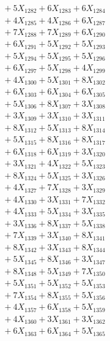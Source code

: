 \documentclass[a4paper,10pt]{article}
\begin{document}
{\begin{align}
&\;  + 5 X_{1282} + 6 X_{1283} + 6 X_{1284} \\[0.3ex]
&\;  + 4 X_{1285} + 4 X_{1286} + 6 X_{1287} \\[0.3ex]
&\;  + 7 X_{1288} + 7 X_{1289} + 6 X_{1290} \\[0.3ex]
&\;  + 6 X_{1291} + 5 X_{1292} + 5 X_{1293} \\[0.3ex]
&\;  + 5 X_{1294} + 5 X_{1295} + 5 X_{1296} \\[0.3ex]
&\;  + 6 X_{1297} + 5 X_{1298} + 4 X_{1299} \\[0.5ex]\allowbreak
&\;  + 4 X_{1300} + 5 X_{1301} + 8 X_{1302} \\[0.3ex]
&\;  + 6 X_{1303} + 6 X_{1304} + 6 X_{1305} \\[0.3ex]
&\;  + 5 X_{1306} + 8 X_{1307} + 3 X_{1308} \\[0.3ex]
&\;  + 3 X_{1309} + 3 X_{1310} + 3 X_{1311} \\[0.3ex]
&\;  + 8 X_{1312} + 5 X_{1313} + 8 X_{1314} \\[0.3ex]
&\;  + 5 X_{1315} + 8 X_{1316} + 8 X_{1317} \\[0.3ex]
&\;  + 6 X_{1318} + 6 X_{1319} + 3 X_{1320} \\[0.3ex]
&\;  + 3 X_{1321} + 4 X_{1322} + 5 X_{1323} \\[0.3ex]
&\;  + 8 X_{1324} + 5 X_{1325} + 3 X_{1326} \\[0.3ex]
&\;  + 4 X_{1327} + 7 X_{1328} + 3 X_{1329} \\[0.5ex]\allowbreak
&\;  + 4 X_{1330} + 3 X_{1331} + 7 X_{1332} \\[0.3ex]
&\;  + 4 X_{1333} + 5 X_{1334} + 3 X_{1335} \\[0.3ex]
&\;  + 3 X_{1336} + 8 X_{1337} + 5 X_{1338} \\[0.3ex]
&\;  + 7 X_{1339} + 3 X_{1340} + 8 X_{1341} \\[0.3ex]
&\;  + 8 X_{1342} + 3 X_{1343} + 8 X_{1344} \\[0.3ex]
&\;  + 5 X_{1345} + 8 X_{1346} + 3 X_{1347} \\[0.3ex]
&\;  + 8 X_{1348} + 5 X_{1349} + 7 X_{1350} \\[0.3ex]
&\;  + 5 X_{1351} + 5 X_{1352} + 5 X_{1353} \\[0.3ex]
&\;  + 7 X_{1354} + 8 X_{1355} + 5 X_{1356} \\[0.3ex]
&\;  + 4 X_{1357} + 6 X_{1358} + 5 X_{1359} \\[0.5ex]\allowbreak
&\;  + 4 X_{1360} + 3 X_{1361} + 3 X_{1362} \\[0.3ex]
&\;  + 6 X_{1363} + 6 X_{1364} + 5 X_{1365} \\[0.3ex]

\end{align}}
\end{document}
